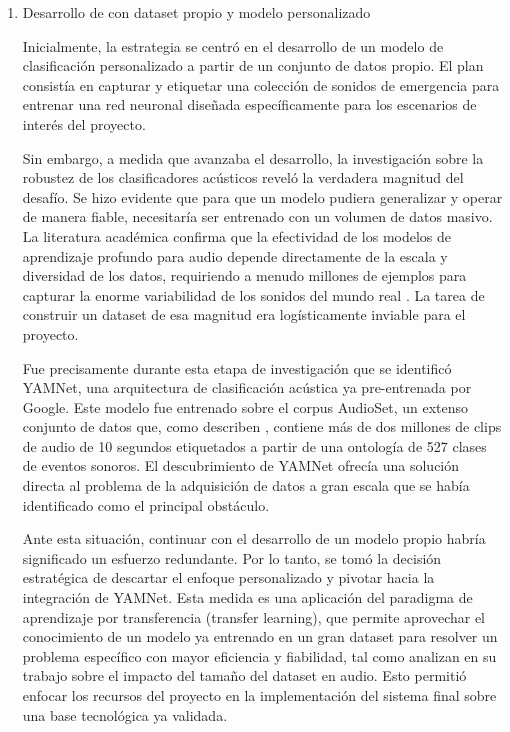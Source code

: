 \begin{enumerate}
      \item Desarrollo de con dataset propio y modelo personalizado

            Inicialmente, la estrategia se centró en el desarrollo de un modelo de clasificación personalizado a partir de un conjunto de datos propio. El plan consistía en capturar y etiquetar una colección de sonidos de emergencia para entrenar una red neuronal diseñada específicamente para los escenarios de interés del proyecto.

            Sin embargo, a medida que avanzaba el desarrollo, la investigación sobre la robustez de los clasificadores acústicos reveló la verdadera magnitud del desafío. Se hizo evidente que para que un modelo pudiera generalizar y operar de manera fiable, necesitaría ser entrenado con un volumen de datos masivo. La literatura académica confirma que la efectividad de los modelos de aprendizaje profundo para audio depende directamente de la escala y diversidad de los datos, requiriendo a menudo millones de ejemplos para capturar la enorme variabilidad de los sonidos del mundo real \cite{gemmeke2017audio}. La tarea de construir un dataset de esa magnitud era logísticamente inviable para el proyecto.

            Fue precisamente durante esta etapa de investigación que se identificó YAMNet, una arquitectura de clasificación acústica ya pre-entrenada por Google. Este modelo fue entrenado sobre el corpus AudioSet, un extenso conjunto de datos que, como describen \citeauthor{gemmeke2017audio} \citeyear{gemmeke2017audio}, contiene más de dos millones de clips de audio de 10 segundos etiquetados a partir de una ontología de 527 clases de eventos sonoros. El descubrimiento de YAMNet ofrecía una solución directa al problema de la adquisición de datos a gran escala que se había identificado como el principal obstáculo.

            Ante esta situación, continuar con el desarrollo de un modelo propio habría significado un esfuerzo redundante. Por lo tanto, se tomó la decisión estratégica de descartar el enfoque personalizado y pivotar hacia la integración de YAMNet. Esta medida es una aplicación del paradigma de aprendizaje por transferencia (transfer learning), que permite aprovechar el conocimiento de un modelo ya entrenado en un gran dataset para resolver un problema específico con mayor eficiencia y fiabilidad, tal como analizan \citeauthor{pons2019deep} \citeyear{pons2019deep} en su trabajo sobre el impacto del tamaño del dataset en audio. Esto permitió enfocar los recursos del proyecto en la implementación del sistema final sobre una base tecnológica ya validada.


\end{enumerate}
